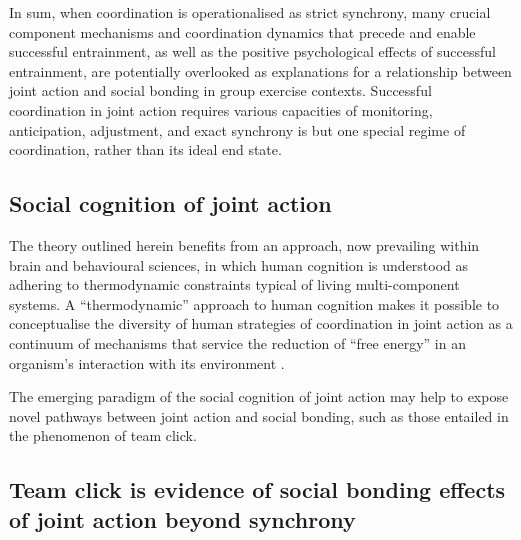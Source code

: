\begin{CJK}{UTF8}{gbsn}
In sum, when coordination is operationalised as strict synchrony, many crucial component mechanisms and coordination dynamics that precede and enable successful entrainment, as well as the positive psychological effects of successful entrainment, are potentially overlooked as explanations for a relationship between joint action and social bonding in group exercise contexts.  Successful coordination in joint action requires various capacities of monitoring, anticipation, adjustment, and exact synchrony is but one special regime of coordination, rather than its ideal end state.


\subsection{Social cognition of joint action}

The theory outlined herein benefits from an approach, now prevailing within brain and behavioural sciences, in which human cognition is understood as adhering to thermodynamic constraints typical of living multi-component systems.  A ``thermodynamic'' approach to human cognition makes it possible to conceptualise the diversity of human strategies of coordination in joint action as a continuum of mechanisms that service the reduction of ``free energy'' in an organism's interaction with its environment \citep{Friston2010,Yufik2013,Yufik2017}.

The emerging paradigm of the social cognition of joint action may help to expose novel pathways between joint action and social bonding, such as those entailed in the phenomenon of team click.



\subsection{Team click is evidence of social bonding effects of joint action beyond synchrony}


\end{CJK}
